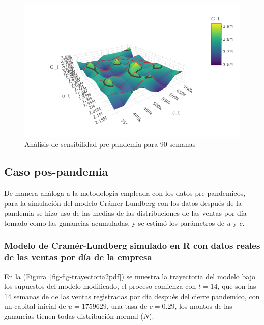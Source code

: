 \documentclass[
  us-letterpaper,
]{scrreprt}
\theoremstyle{definition}
\theoremstyle{plain}
\theoremstyle{plain}
\theoremstyle{remark}
\begin{document}
\begin{figure}[H]

{\centering \includegraphics[width=5.20833in,height=\textheight]{fig-analisispdf.png}

}

\caption{Análisis de sensibilidad pre-pandemia para 90 semanas}

\end{figure}%

\subsection{Caso pos-pandemia}\label{caso-pos-pandemia}

De manera análoga a la metodología empleada con los datos
pre-pandemicos, para la simulación del modelo Crámer-Lundberg con los
datos después de la pandemia se hizo uso de las medias de las
distribuciones de las ventas por día tomado como las ganancias
acumuladas, y se estimó los parámetros de \(u\) y \(c\).

\subsubsection{Modelo de Cramér-Lundberg simulado en R con datos reales
de las ventas por día de la
empresa}\label{modelo-de-cramuxe9r-lundberg-simulado-en-r-con-datos-reales-de-las-ventas-por-duxeda-de-la-empresa}

En la (Figura~\ref{fig-fig-trayectoria2pdf}) se muestra la trayectoria
del modelo bajo los supuestos del modelo modificado, el proceso comienza
con \(t = 14\), que son las \(14\) semanas de de las ventas registradas
por día después del cierre pandemico, con un capital inicial de
\(u= 1759629\), una tasa de \(c= 0.29\), los montos de las ganancias
tienen todas distribución normal (\(N\)).
\end{document}
